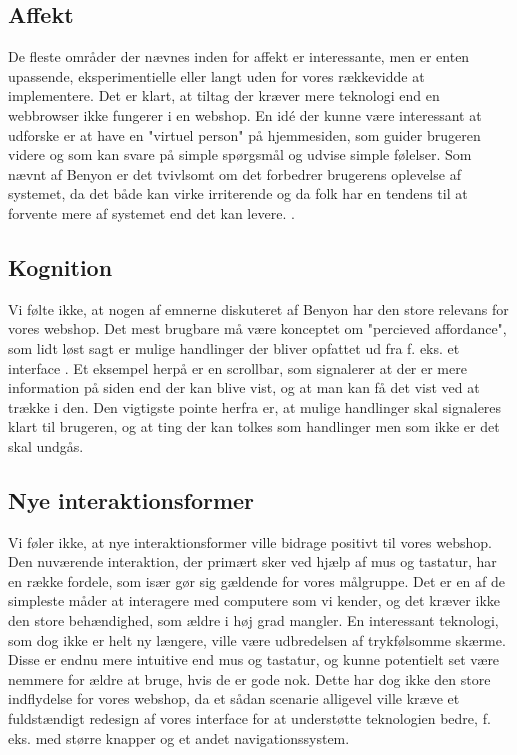 \subsection{Affekt}
De fleste områder der nævnes inden for affekt er interessante, men er enten upassende, eksperimentielle eller langt uden for vores rækkevidde at
implementere. Det er klart, at tiltag der kræver mere teknologi end en webbrowser ikke fungerer i en webshop. En idé der kunne være interessant
at udforske er at have en "virtuel person" på hjemmesiden, som guider brugeren videre og som kan svare på simple spørgsmål og udvise simple følelser.
Som nævnt af Benyon er det tvivlsomt om det forbedrer brugerens oplevelse af systemet, da det både kan virke irriterende og da folk har en tendens
til at forvente mere af systemet end det kan levere. \cite[s. 571]{Benyon2010}.

\subsection{Kognition}
Vi følte ikke, at nogen af emnerne diskuteret af Benyon har den store relevans for vores webshop. Det mest brugbare må være konceptet om
"percieved affordance", som lidt løst sagt er mulige handlinger der bliver opfattet ud fra f. eks. et interface \cite[s.588]{Benyon}. Et
eksempel herpå er en scrollbar, som signalerer at der er mere information på siden end der kan blive vist, og at man kan få det vist ved at
trække i den. Den vigtigste pointe herfra er, at mulige handlinger skal signaleres klart til brugeren, og at ting der kan tolkes som handlinger
men som ikke er det skal undgås.

\subsection{Nye interaktionsformer}
Vi føler ikke, at nye interaktionsformer ville bidrage positivt til vores webshop. Den nuværende interaktion, der primært sker ved hjælp
af mus og tastatur, har en række fordele, som især gør sig gældende for vores målgruppe. Det er en af de simpleste måder at interagere
med computere som vi kender, og det kræver ikke den store behændighed, som ældre i høj grad mangler. En interessant teknologi, som dog ikke er
helt ny længere, ville være udbredelsen af trykfølsomme skærme. Disse er endnu mere intuitive end mus og tastatur, og kunne potentielt set være
nemmere for ældre at bruge, hvis de er gode nok. Dette har dog ikke den store indflydelse for vores webshop, da et sådan scenarie alligevel ville kræve
et fuldstændigt redesign af vores interface for at understøtte teknologien bedre, f. eks. med større knapper og et andet navigationssystem.

